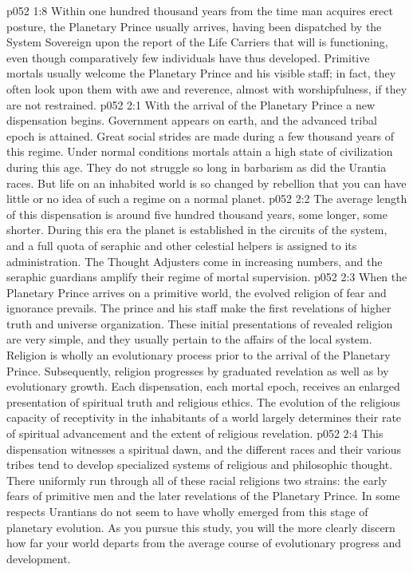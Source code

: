 \vs p052 1:8 \pc Within one hundred thousand years from the time man acquires erect posture, the Planetary Prince usually arrives, having been dispatched by the System Sovereign upon the report of the Life Carriers that will is functioning, even though comparatively few individuals have thus developed. Primitive mortals usually welcome the Planetary Prince and his visible staff; in fact, they often look upon them with awe and reverence, almost with worshipfulness, if they are not restrained.
\vs p052 2:1 With the arrival of the Planetary Prince a new dispensation begins. Government appears on earth, and the advanced tribal epoch is attained. Great social strides are made during a few thousand years of this regime. Under normal conditions mortals attain a high state of civilization during this age. They do not struggle so long in barbarism as did the Urantia races. But life on an inhabited world is so changed by rebellion that you can have little or no idea of such a regime on a normal planet.
\vs p052 2:2 The average length of this dispensation is around five hundred thousand years, some longer, some shorter. During this era the planet is established in the circuits of the system, and a full quota of seraphic and other celestial helpers is assigned to its administration. The Thought Adjusters come in increasing numbers, and the seraphic guardians amplify their regime of mortal supervision.
\vs p052 2:3 When the Planetary Prince arrives on a primitive world, the evolved religion of fear and ignorance prevails. The prince and his staff make the first revelations of higher truth and universe organization. These initial presentations of revealed religion are very simple, and they usually pertain to the affairs of the local system. Religion is wholly an evolutionary process prior to the arrival of the Planetary Prince. Subsequently, religion progresses by graduated revelation as well as by evolutionary growth. Each dispensation, each mortal epoch, receives an enlarged presentation of spiritual truth and religious ethics. The evolution of the religious capacity of receptivity in the inhabitants of a world largely determines their rate of spiritual advancement and the extent of religious revelation.
\vs p052 2:4 This dispensation witnesses a spiritual dawn, and the different races and their various tribes tend to develop specialized systems of religious and philosophic thought. There uniformly run through all of these racial religions two strains: the early fears of primitive men and the later revelations of the Planetary Prince. In some respects Urantians do not seem to have wholly emerged from this stage of planetary evolution. As you pursue this study, you will the more clearly discern how far your world departs from the average course of evolutionary progress and development.
